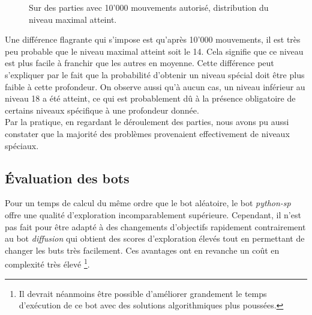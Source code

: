 \documentclass[a4paper,12pt]{article}
\begin{document}
\begin{figure}[H]
  \caption{\label{fig:impulse_level_reached} Sur des parties avec 10'000
  mouvements autorisé, distribution du niveau maximal atteint.}
\end{figure}

Une différence flagrante qui s'impose est qu'après 10'000 mouvements, il est
très peu probable que le niveau maximal atteint soit le 14. Cela signifie que
ce niveau est plus facile à franchir que les autres en moyenne. Cette différence
peut s'expliquer par le fait que la probabilité d'obtenir un niveau spécial doit
être plus faible à cette profondeur. On observe aussi qu'à aucun cas, un niveau
inférieur au niveau 18 a été atteint, ce qui est probablement dû à la présence
obligatoire de certains niveaux spécifique à une profondeur donnée.
\\
Par la pratique, en regardant le déroulement des parties, nous avons pu aussi
constater que la majorité des problèmes provenaient effectivement de niveaux
spéciaux.

\subsection{Évaluation des bots}
Pour un temps de calcul du même ordre que le bot aléatoire, le bot
{\em python-sp} offre une qualité d'exploration incomparablement supérieure.
Cependant, il n'est pas fait pour être adapté à des changements d'objectifs
rapidement contrairement au bot {\em diffusion} qui obtient des scores
d'exploration élevés tout en permettant de changer les buts très facilement. Ces
avantages ont en revanche un coût en complexité très élevé \footnote{ Il devrait
néanmoins être possible d'améliorer grandement le temps d'exécution de ce bot
avec des solutions algorithmiques plus poussées.}.
\end{document}
